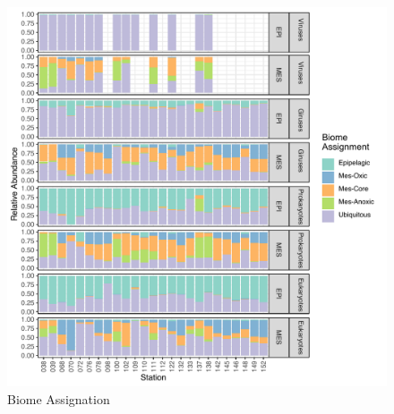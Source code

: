 \documentclass[fleqn,10pt]{wlscirep}
\begin{document}
\begin{figure}[ht]
    \centering
    \includegraphics[scale=0.8]{images/simple_biome_projection_to_print.pdf}
    \caption{Biome Assignation}
    \label{fig:cca_OS}
\end{figure}
\end{document}
